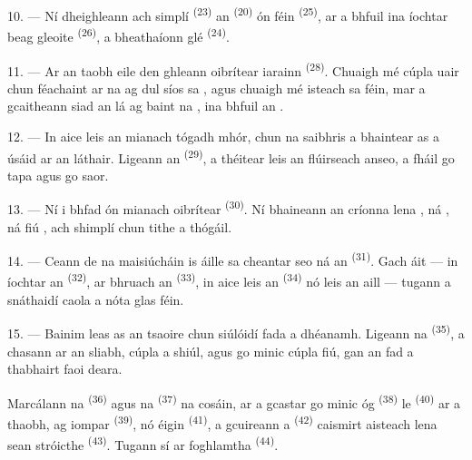 10. --- Ní dheighleann ach  simplí \textsuperscript{(23)} an
 \textsuperscript{(20)} ón  féin
\textsuperscript{(25)}, ar a bhfuil ina íochtar  beag gleoite
\textsuperscript{(26)}, a bheathaíonn  glé
\textsuperscript{(24)}.

11. --- Ar an taobh eile den ghleann oibrítear  iarainn
\textsuperscript{(28)}. Chuaigh mé cúpla uair chun féachaint ar na
 ag dul síos sa , agus chuaigh mé isteach sa
 féin, mar a gcaitheann siad an lá ag baint na ,
ina bhfuil an .

12. --- In aice leis an mianach tógadh  mhór, chun na saibhris
a bhaintear as a úsáid ar an láthair. Ligeann an 
\textsuperscript{(29)}, a théitear leis an  flúirseach anseo,
 a fháil go tapa agus go saor.

13. --- Ní i bhfad ón mianach oibrítear  \textsuperscript{(30)}. Ní
bhaineann an  críonna lena  ,
ná , ná fiú , ach 
shimplí chun tithe a thógáil.

14. --- Ceann de na maisiúcháin is áille sa cheantar seo ná an 
\textsuperscript{(31)}. Gach áit --- in íochtar an 
\textsuperscript{(32)}, ar bhruach an  \textsuperscript{(33)}, in
aice leis an  \textsuperscript{(34)} nó leis an aill ---
tugann a snáthaidí caola a nóta glas féin.

\VUsaut{3.0mm}
\VUsaut{3.0mm}

15. --- Bainim leas as an tsaoire chun siúlóidí fada a dhéanamh. Ligeann na
 \textsuperscript{(35)}, a chasann ar an sliabh, cúpla
 a shiúl, agus go minic cúpla  fiú, gan an
fad a thabhairt faoi deara.

Marcálann na  \textsuperscript{(36)} agus na
 \textsuperscript{(37)} na cosáin, ar a gcastar go minic
 óg \textsuperscript{(38)} le 
\textsuperscript{(40)} ar a thaobh, ag iompar 
\textsuperscript{(39)}, nó  éigin \textsuperscript{(41)}, a
gcuireann a  \textsuperscript{(42)} caismirt aisteach lena
 sean stróicthe \textsuperscript{(43)}. Tugann sí ar
  foghlamtha \textsuperscript{(44)}.

